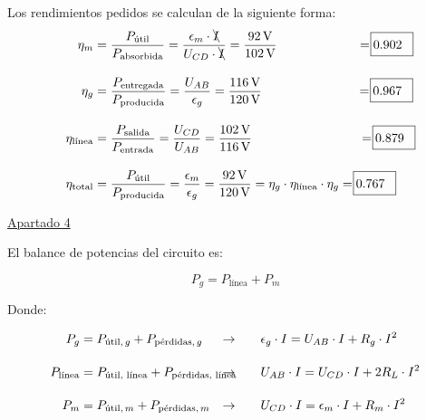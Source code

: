 \begin{example}
\vspace{5mm}

Los rendimientos pedidos se calculan de la siguiente forma:
\begin{align*}
  \eta_m &= \frac{P_{\textrm{útil}}}{P_{\textrm{absorbida}}} = \frac{\epsilon_m \cdot \bcancel{I}}{U_{CD} \cdot \bcancel{I}} = \frac{\qty{92}{\volt}}{\qty{102}{\volt}} \hspace{22mm} = \rlap{\kern-0.5ex\fbox{\rule[-2.5pt]{0pt}{12pt}\rule{27pt}{0pt}}} 0.902\\[10pt]
  \eta_g &= \frac{P_{\textrm{entregada}}}{P_{\textrm{producida}}} = \frac{U_{AB}}{\epsilon_g} = \frac{\qty{116}{\volt}}{\qty{120}{\volt}} \hspace{26.1mm}= \rlap{\kern-0.5ex\fbox{\rule[-2.5pt]{0pt}{12pt}\rule{27pt}{0pt}}} 0.967\\[10pt]
  \eta_{\textrm{línea}} &= \frac{P_{\textrm{salida}}}{P_{\textrm{entrada}}} = \frac{U_{CD}}{U_{AB}} = \frac{\qty{102}{\volt}}{\qty{116}{\volt}} \hspace{29.5mm} = \rlap{\kern-0.5ex\fbox{\rule[-2.5pt]{0pt}{12pt}\rule{27pt}{0pt}}} 0.879\\[10pt]
  \eta_{\textrm{total}} &= \frac{P_{\textrm{útil}}}{P_{\textrm{producida}}} = \frac{\epsilon_m}{\epsilon_g} = \frac{\qty{92}{\volt}}{\qty{120}{\volt}} = \eta_g \cdot \eta_{\textrm{línea}} \cdot \eta_g = \rlap{\kern-0.5ex\fbox{\rule[-2.5pt]{0pt}{12pt}\rule{27pt}{0pt}}} 0.767
\end{align*}

\vspace{6mm}

\underline{Apartado 4}

\vspace{5mm}

El balance de potencias del circuito es:

\[
  P_{g} = P_{\textrm{línea}} + P_{m}
\]

Donde:

\begin{align*}
  P_{g} &= P_{\textrm{útil}, \, g} + P_{\textrm{pérdidas}, \, g} &\rightarrow  \qquad &\epsilon_g \cdot I = U_{AB} \cdot I + R_g \cdot I^2 \\[10pt]
  P_{\textrm{línea}} &= P_{\textrm{útil, línea}} + P_{\textrm{pérdidas, línea}} \hspace{-20mm} &\rightarrow \qquad &U_{AB} \cdot I = U_{CD} \cdot I + 2 R_L \cdot I^2\\[10pt]
  P_{m} &= P_{\textrm{útil}, \, m} + P_{\textrm{pérdidas}, \, m} &\rightarrow  \qquad &U_{CD} \cdot I = \epsilon_m \cdot I + R_m \cdot I^2 
\end{align*}
	    
\end{example}
	
